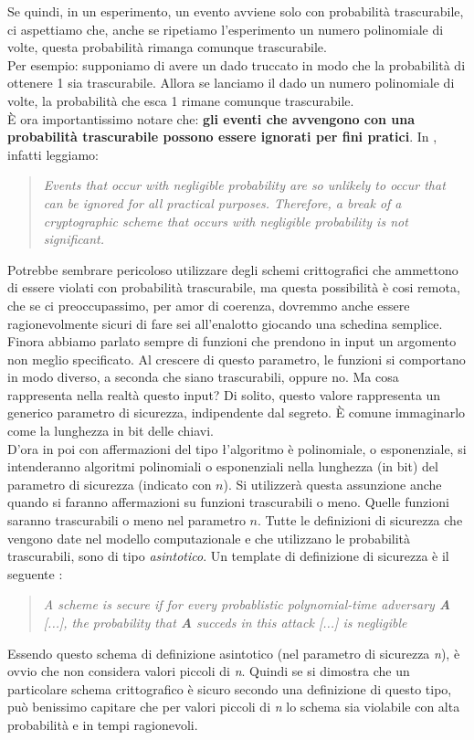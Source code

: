 \documentclass[a4paper,openright,twoside,12pt]{report}
\begin{document}
Se quindi, in un esperimento, un evento avviene solo con probabilit\`a trascurabile, ci aspettiamo che, anche se ripetiamo l'esperimento un numero polinomiale di volte, questa probabilit\`a
rimanga comunque trascurabile.\\
Per esempio: supponiamo di avere un dado truccato in modo che la probabilit\`a di ottenere 1 sia trascurabile. Allora se lanciamo il dado un numero polinomiale di volte, la probabilit\`a
che esca 1 rimane comunque trascurabile.\\
\`E ora importantissimo notare che:
\textbf{gli eventi che avvengono con una probabilit\`a trascurabile possono essere ignorati per fini pratici}.
In \cite{1206501}, infatti leggiamo:
\begin{quotation}
\emph{Events that occur with negligible probability are so unlikely to occur that can be ignored for all practical purposes. Therefore,
a break of a cryptographic scheme that occurs with negligible probability is not significant.}
\end{quotation}
Potrebbe sembrare pericoloso utilizzare degli schemi crittografici che ammettono di essere violati con probabilit\`a trascurabile, ma questa possibilit\`a \`e cosi remota, che se ci preoccupassimo, per amor di coerenza, dovremmo anche essere ragionevolmente sicuri di 
fare sei all'enalotto giocando una schedina semplice.
Finora abbiamo parlato sempre di funzioni che prendono in input un argomento non meglio specificato. 
Al crescere di questo parametro, le funzioni si comportano in modo diverso, a seconda che siano trascurabili, oppure no.
Ma cosa rappresenta nella realt\`a questo input?
Di solito, questo valore rappresenta un generico parametro di sicurezza, indipendente dal segreto. \`E comune immaginarlo come la lunghezza in bit delle chiavi.\\
D'ora in poi con affermazioni del tipo \flqq\l'algoritmo \`e polinomiale, o esponenziale\frqq, si intenderanno algoritmi polinomiali o esponenziali nella lunghezza (in bit) del parametro di sicurezza (indicato con $n$). Si utilizzer\`a questa assunzione anche quando si faranno affermazioni su funzioni trascurabili o meno. Quelle funzioni saranno trascurabili o meno nel parametro $n$.
Tutte le definizioni di sicurezza che vengono date nel modello computazionale e che utilizzano le probabilit\`a trascurabili, sono di tipo \emph{asintotico}.
Un template di definizione di sicurezza è il seguente \cite{1206501}:
\begin{quotation}
\emph{A scheme is secure if for every probablistic polynomial-time adversary \textbf{A} [...], the probability that \textbf{A} succeds in this attack [...]
is negligible}
\end{quotation}
Essendo questo schema di definizione asintotico (nel parametro di sicurezza \emph{n}), \`e ovvio che non considera valori piccoli di \emph{n}.
Quindi se si dimostra che un particolare schema crittografico \`e sicuro secondo una definizione di questo tipo, pu\`o benissimo capitare che per valori piccoli di \emph{n} lo schema
sia violabile con alta probabilit\`a e in tempi ragionevoli.
\end{document}
